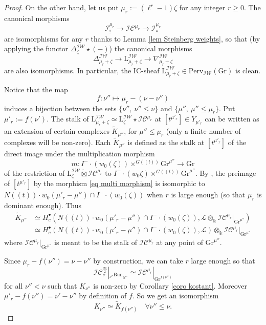 \documentclass[11pt]{amsart}
\theoremstyle{plain}
\theoremstyle{remark}
\numberwithin{equation}{section}
\begin{document}
\begin{proof}
  On the other hand, let us put $\mu_r:=(\ell^r-1)\zeta$ for any integer $r\geq0$. The canonical morphisms
  $$\mathcal{I}^{\mu_r}_!\to\mathcal{IC}^{\mu_r} \to\mathcal{I}^{\mu_r}_*$$
  are isomorphisms for any $r$ thanks to Lemma \ref{lem Steinberg weights}, so that (by applying the functor $\Delta^{\mathcal{IW}}_{\zeta}\star(-)$) the canonical morphisms
$$\Delta^{\mathcal{IW}}_{\mu_r+\zeta}\to\mathrm{L}_{\mu_r+\zeta}^\mathcal{IW}\to\nabla^{\mathcal{IW}}_{\mu_r+\zeta}$$
are also isomorphisms. In particular, the IC-sheaf $\mathrm{L}_{\mu_r+\zeta}^\mathcal{IW}\in\mathrm{Perv}_{\mathcal{IW}}(\mathrm{Gr})$ is clean. 

Notice that the map 
$$f:\nu''\mapsto \mu_r-(\nu-\nu'') $$
induces a bijection between the sets $\{\nu'',~\nu''\leq \nu\}$ and $\{\mu'',~\mu''\leq \mu_r\}$. 
Put $\mu'_r:=f(\nu')$. The stalk of $\mathrm{L}_{\mu_r+\zeta}^\mathcal{IW}\simeq \mathrm{L}_{\zeta}^\mathcal{IW}\star \mathcal{IC}^{\mu_r}$ at $[t^{\mu'_r}]\in Y_{\mu'_r}$ can be written as an extension of certain complexes $\widetilde{K}_{\mu''}$, for $\mu''\leq\mu_r$ (only a finite number of complexes will be non-zero). Each $\widetilde{K}_{\mu''}$ is defined as the stalk at $[t^{\mu'_r}]$ of the direct image under the multiplication morphism
\begin{equation}\label{eq multi morphism}
    m:I^-\cdot(w_0(\zeta))\times^{G((t))} \mathrm{Gr}^{\mu''}\to  \mathrm{Gr}
\end{equation}
of the restriction of $\mathrm{L}_{\zeta}^\mathcal{IW}\widetilde{\boxtimes}\mathcal{IC}^{\mu_r}$ to $I^-\cdot(w_0\zeta)\times^{G((t))} \mathrm{Gr}^{\mu''}$. By \cite[Remark 5.3.3]{ABBGM}, the preimage of $[t^{\mu'_r}]$ by the morphism \eqref{eq multi morphism} is isomorphic to $N((t))\cdot w_0(\mu'_r-\mu'')\cap I^-\cdot(w_0(\zeta))$ when $r$ is large enough (so that $\mu_r$ is dominant enough). Thus
\begin{align*}
		    \widetilde{K}_{\mu''}&\simeq H^\bullet_c(N((t))\cdot w_0(\mu'_r-\mu'')\cap I^-\cdot(w_0(\zeta)),\mathcal{L}\otimes_\mathbb{k} \mathcal{IC}^{\mu_r}|_{\mathrm{Gr}^{\mu''}})\\
      &\simeq H^\bullet_c(N((t))\cdot w_0(\mu'_r-\mu'')\cap I^-\cdot(w_0(\zeta)),\mathcal{L})\otimes_\mathbb{k} \mathcal{IC}^{\mu_r}|_{\mathrm{Gr}^{\mu''}}
		\end{align*}
 where $\mathcal{IC}^{\mu_r}|_{\mathrm{Gr}^{\mu''}}$ is meant to be the stalk of $\mathcal{IC}^{\mu_r}$ at any point of $\mathrm{Gr}^{\mu''}$. 

Since $\mu_r-f(\nu'')=\nu-\nu''$ by construction, we can take $r$ large enough so that 
$$\mathcal{IC}^{\frac{\infty}{2}}_{\nu}|_{{_{ \nu''}\mathrm{Bun}}_{N^-}} \simeq \mathcal{IC}^{\mu_r}|_{\mathrm{Gr}^{f(\nu'')}}$$
for all $\nu''<\nu$ such that $K_{\nu''}$ is non-zero by Corollary \ref{coro kostant}. Moreover $\mu'_r-f(\nu'')=\nu'-\nu''$ by definition of $f$. So we get an isomorphism
$$K_{\nu''}\simeq \widetilde{K}_{f(\nu'')}\quad\forall \nu''\leq\nu. $$


\end{proof}
\end{document}
